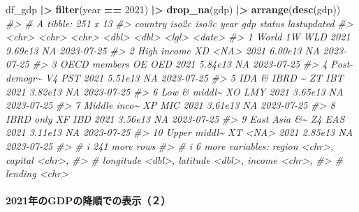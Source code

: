 \documentclass[
  xelatex, ja=standard]{bxjsbook}
\newenvironment{Shaded}{\begin{snugshade}}{\end{snugshade}}
\newcommand{\CommentTok}[1]{\textcolor[rgb]{0.56,0.35,0.01}{\textit{#1}}}
\newcommand{\DecValTok}[1]{\textcolor[rgb]{0.00,0.00,0.81}{#1}}
\newcommand{\FunctionTok}[1]{\textcolor[rgb]{0.13,0.29,0.53}{\textbf{#1}}}
\newcommand{\NormalTok}[1]{#1}
\newcommand{\SpecialCharTok}[1]{\textcolor[rgb]{0.81,0.36,0.00}{\textbf{#1}}}
\theoremstyle{definition}
\theoremstyle{definition}
\theoremstyle{definition}
\theoremstyle{definition}
\theoremstyle{remark}
\begin{document}
\begin{Shaded}
\begin{Highlighting}[]
\NormalTok{df\_gdp }\SpecialCharTok{|\textgreater{}} \FunctionTok{filter}\NormalTok{(year }\SpecialCharTok{==} \DecValTok{2021}\NormalTok{) }\SpecialCharTok{|\textgreater{}} \FunctionTok{drop\_na}\NormalTok{(gdp) }\SpecialCharTok{|\textgreater{}} \FunctionTok{arrange}\NormalTok{(}\FunctionTok{desc}\NormalTok{(gdp))}
\CommentTok{\#\textgreater{} \# A tibble: 251 x 13}
\CommentTok{\#\textgreater{}    country      iso2c iso3c  year     gdp status lastupdated}
\CommentTok{\#\textgreater{}    \textless{}chr\textgreater{}        \textless{}chr\textgreater{} \textless{}chr\textgreater{} \textless{}dbl\textgreater{}   \textless{}dbl\textgreater{} \textless{}lgl\textgreater{}  \textless{}date\textgreater{}     }
\CommentTok{\#\textgreater{}  1 World        1W    WLD    2021 9.69e13 NA     2023{-}07{-}25 }
\CommentTok{\#\textgreater{}  2 High income  XD    \textless{}NA\textgreater{}   2021 6.00e13 NA     2023{-}07{-}25 }
\CommentTok{\#\textgreater{}  3 OECD members OE    OED    2021 5.84e13 NA     2023{-}07{-}25 }
\CommentTok{\#\textgreater{}  4 Post{-}demogr\textasciitilde{} V4    PST    2021 5.51e13 NA     2023{-}07{-}25 }
\CommentTok{\#\textgreater{}  5 IDA \& IBRD \textasciitilde{} ZT    IBT    2021 3.82e13 NA     2023{-}07{-}25 }
\CommentTok{\#\textgreater{}  6 Low \& middl\textasciitilde{} XO    LMY    2021 3.65e13 NA     2023{-}07{-}25 }
\CommentTok{\#\textgreater{}  7 Middle inco\textasciitilde{} XP    MIC    2021 3.61e13 NA     2023{-}07{-}25 }
\CommentTok{\#\textgreater{}  8 IBRD only    XF    IBD    2021 3.56e13 NA     2023{-}07{-}25 }
\CommentTok{\#\textgreater{}  9 East Asia \&\textasciitilde{} Z4    EAS    2021 3.11e13 NA     2023{-}07{-}25 }
\CommentTok{\#\textgreater{} 10 Upper middl\textasciitilde{} XT    \textless{}NA\textgreater{}   2021 2.85e13 NA     2023{-}07{-}25 }
\CommentTok{\#\textgreater{} \# i 241 more rows}
\CommentTok{\#\textgreater{} \# i 6 more variables: region \textless{}chr\textgreater{}, capital \textless{}chr\textgreater{},}
\CommentTok{\#\textgreater{} \#   longitude \textless{}dbl\textgreater{}, latitude \textless{}dbl\textgreater{}, income \textless{}chr\textgreater{},}
\CommentTok{\#\textgreater{} \#   lending \textless{}chr\textgreater{}}
\end{Highlighting}
\end{Shaded}

\hypertarget{ux5e74ux306egdpux306eux964dux9806ux3067ux306eux8868ux793auxff12-1}{%
\paragraph{2021年のGDPの降順での表示（２）}\label{ux5e74ux306egdpux306eux964dux9806ux3067ux306eux8868ux793auxff12-1}}
\end{document}
